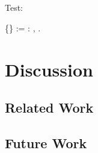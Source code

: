 \documentclass[sigplan,10pt,anonymous,review]{acmart}\settopmatter{printfolios=true,printccs=false,printacmref=false}
\begin{document}
\section{\NFTWO}
\section{\NFO}

Test:

\begin{coqdoccode}
  \coqdocnoindent
  \Definition{}  \{\}   := \Math\forall {}: ,   \Math\leftrightarrow{}  .\coqdoceol
  \coqdocemptyline
\end{coqdoccode}


\section{Discussion}
\subsection{Related Work}
\subsection{Future Work}







\appendix
\end{document}
